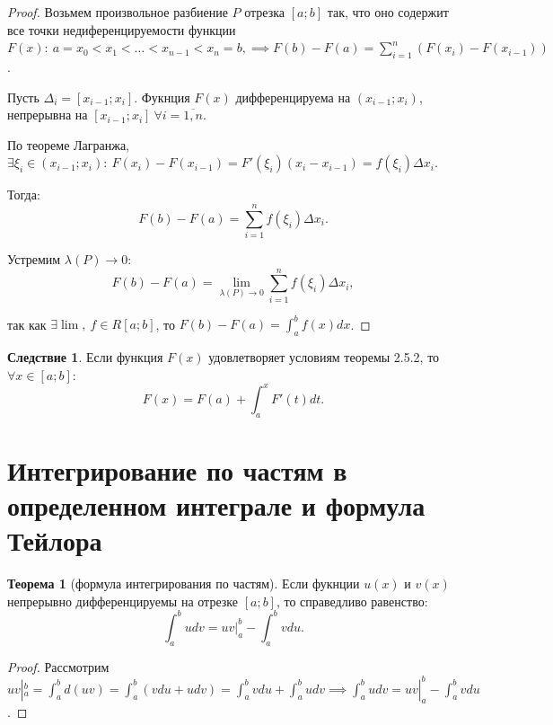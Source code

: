 \documentclass{report}
\theoremstyle{definition}
\newtheorem*{effect}{Следствие}
\newtheorem{theorem}{Теорема}[section]
\begin{document}
\begin{proof}
  Возьмем произвольное разбиение $P$ отрезка $[a;b]$ так, что оно содержит
  все точки недиференцируемости функции $F(x): \ a=x_{0} < x_{1} < \ldots
    <x_{n-1} < x_{n} = b, \implies F(b) - F(a) = \sum_{i=1}^{n}(F(x_{i}) - F(x_{i-1}))$.

  Пусть $\Delta_{i} = [x_{i-1};x_{i}]$. Фукнция $F(x)$ дифференцируема на
  $(x_{i-1};x_{i})$, непрерывна на $[x_{i-1};x_{i}] \ \forall i = \overline{1,n}$.

  По теореме Лагранжа, $\exists \xi_{i} \in (x_{i-1};x_{i}): \ F(x_{i}) - F(x_{i-1})=
    F'(\xi_{i})(x_{i} - x_{i-1}) = f(\xi_{i})\Delta x_{i}$.

  Тогда:
  \begin{equation*}
    F(b) - F(a) = \sum_{i=1}^{n}f(\xi_{i})\Delta x_{i}.
  \end{equation*}

  Устремим $\lambda (P) \rightarrow 0$:
  \begin{equation*}
    F(b) - F(a) = \underset{\lambda(P)\rightarrow0}{\lim}\sum_{i=1}^{n}f(\xi_{i})\Delta x_{i},
  \end{equation*}

  так как $\exists \lim, \ f\in R[a;b]$, то $F(b) - F(a) = \int_{a}^{b}f(x)dx$.
\end{proof}

\begin{effect}
  Если функция $F(x)$ удовлетворяет условиям теоремы 2.5.2, то $\forall x \in [a;b]:$
  \begin{equation*}
    F(x) = F(a) + \int_{a}^{x}F'(t)dt.
  \end{equation*}
\end{effect}

\section{Интегрирование по частям в определенном интеграле и формула Тейлора}

\begin{theorem}[формула интегрирования по частям]
  Если фукнции $u(x)$ и $v(x)$ непрерывно дифференцируемы на отрезке $[a;b]$, то
  справедливо равенство:
  \begin{equation*}
    \int_{a}^{b}udv = uv|_{a}^{b} - \int_{a}^{b}vdu.
  \end{equation*}
\end{theorem}

\begin{proof}
  Рассмотрим $uv|_{a}^{b} = \int_{a}^{b}d(uv) = \int_{a}^{b}(vdu + udv) = \int_{a}^{b}vdu +
    \int_{a}^{b}udv \implies \int_{a}^{b}udv = uv|_{a}^{b} - \int_{a}^{b}vdu$.
\end{proof}
\end{document}
